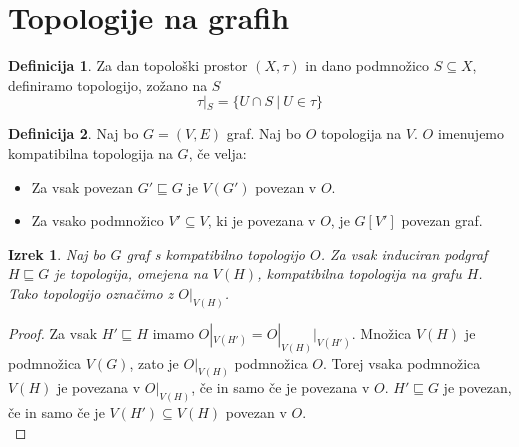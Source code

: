 \documentclass[a4paper, 12pt]{book}
\newtheorem{theorem}{Izrek}[section]
\theoremstyle{definition}
\newtheorem{definition}{Definicija}[section]
\begin{document}
\section{Topologije na grafih}
\begin{definition}
  Za dan topološki prostor $(X, \tau)$ in dano podmnožico $S \subseteq X$, definiramo
  topologijo, zožano na $S$ \[\tau|_S = \{U \cap S\ |\ U \in \tau\}\]
\end{definition}
\begin{definition}
  Naj bo $G = (V,E)$ graf. Naj bo $O$ topologija na $V$. $O$ imenujemo kompatibilna
  topologija na $G$, če velja:
  \begin{itemize}
    \item[(1)] Za vsak povezan $G' \sqsubseteq G$ je $V(G')$ povezan v $O$.
    \item[(2)] Za vsako podmnožico $V' \subseteq V$, ki je povezana v $O$, je $G[V']$ povezan graf.
  \end{itemize}
\end{definition}
\begin{theorem}\label{theorem1}
  Naj bo $G$ graf s kompatibilno topologijo $O$. Za vsak induciran podgraf
  $H \sqsubseteq G$ je topologija, omejena na $V(H)$, kompatibilna topologija
  na grafu $H$. Tako topologijo označimo z $O|_{V(H)}$.
\end{theorem}
\begin{proof}
  Za vsak $H' \sqsubseteq H$ imamo $O|_{V(H')} = O|_{V(H)}|_{V(H')}$. Množica $V(H)$
  je podmnožica $V(G)$, zato je $O|_{V(H)}$ podmnožica $O$.
  Torej vsaka
  podmnožica $V(H)$ je povezana v $O|_{V(H)}$, če in samo če je povezana v $O$.
  $H' \sqsubseteq G$ je povezan, če in samo če je $V(H') \subseteq V(H)$ povezan v $O$.\\
\end{proof}
\end{document}
